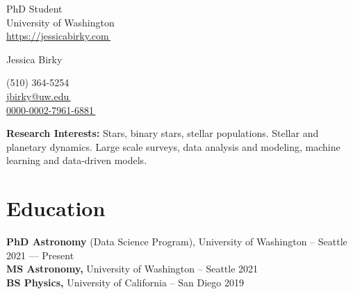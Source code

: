\documentclass[a4,11pt]{article}
\makeatletter
\def\blfootnote{\xdef\@thefnmark{}\@footnotetext}
\let\orighref\href
\renewcommand{\href}[2]{\orighref{#1}{#2\,\scriptsize\faExternalLink}}
\makeatother
\begin{document}
\begin{center}
    \begin{minipage}[b]{0.24\textwidth}
            \flushleft  
            PhD Student \\
            University of Washington \\
            {\href{https://jessicabirky.com}{https://jessicabirky.com} } \\
    \end{minipage}   
    \begin{minipage}[b]{0.5\textwidth}
            \centering
            {\Huge Jessica Birky} \\ %
            \vspace{0.1cm}
    \end{minipage}%
    \begin{minipage}[b]{0.24\textwidth}
            \flushright
            (510) 364-5254 \\
            \href{mailto:jbirky@uw.edu}{jbirky@uw.edu} \\
            \href{https://orcid.org/0000-0002-7961-6881}{0000-0002-7961-6881}
    \end{minipage}%

\blfootnote{\centering\normalsize\color{gray} \textit{[Last updated: \today]}}
    
\vspace{-0.15cm} 
{\color{UI_blue} \hrulefill}
\end{center}
\textbf{Research Interests:} Stars, binary stars, stellar populations. Stellar and planetary dynamics. Large scale surveys, data analysis and modeling, machine learning and data-driven models. 
\vspace{-0.2cm}

\section{Education }
\textbf{PhD Astronomy} (Data Science Program), University of Washington -- Seattle \hfill 2021 --- Present \\ 
\vspace{0.1cm}
\textbf{MS Astronomy,} University of Washington -- Seattle \hfill 2021 \\
\vspace{0.1cm}
\textbf{BS Physics,} University of California -- San Diego \hfill 2019
\end{document}
